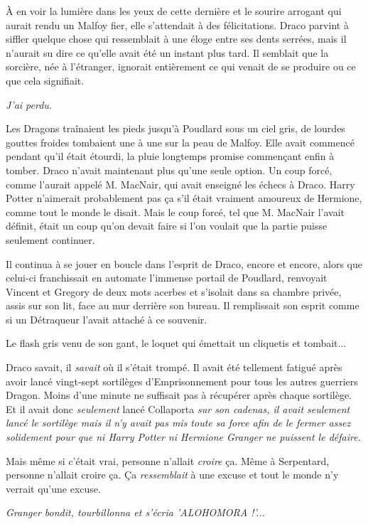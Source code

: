 À en voir la lumière dans les yeux de cette dernière et le sourire arrogant qui aurait rendu un Malfoy fier, elle s'attendait à des félicitations. Draco parvint à siffler quelque chose qui ressemblait à une éloge entre ses dents serrées, mais il n'aurait su dire ce qu'elle avait été un instant plus tard. Il semblait que la sorcière, née à l'étranger, ignorait entièrement ce qui venait de se produire ou ce que cela signifiait.

\emph{J'ai perdu.} 

Les Dragons traînaient les pieds jusqu'à Poudlard sous un ciel gris, de lourdes gouttes froides tombaient une à une sur la peau de Malfoy. Elle avait commencé pendant qu'il était étourdi, la pluie longtemps promise commençant enfin à tomber. Draco n'avait maintenant plus qu'une seule option. Un coup forcé, comme l'aurait appelé M. MacNair, qui avait enseigné les échecs à Draco. Harry Potter n'aimerait probablement pas ça s'il était vraiment amoureux de Hermione, comme tout le monde le disait. Mais le coup forcé, tel que M. MacNair l'avait définit, était un coup qu'on devait faire si l'on voulait que la partie puisse seulement continuer.

Il continua à se jouer en boucle dans l'esprit de Draco, encore et encore, alors que celui-ci franchissait en automate l'immense portail de Poudlard, renvoyait Vincent et Gregory de deux mots acerbes et s'isolait dans sa chambre privée, assis sur son lit, face au mur derrière son bureau. Il remplissait son esprit comme si un Détraqueur l'avait attaché à ce souvenir.

Le flash gris venu de son gant, le loquet qui émettait un cliquetis et tombait...

Draco savait, il \emph{savait}  où il s'était trompé. Il avait été tellement fatigué après avoir lancé vingt-sept sortilèges d'Emprisonnement pour tous les autres guerriers Dragon. Moins d'une minute ne suffisait pas à récupérer après chaque sortilège. Et il avait donc \emph{seulement}  lancé Collaporta \emph{sur son cadenas, il avait seulement lancé le sortilège mais il n'y avait pas mis toute sa force afin de le fermer assez solidement pour que ni Harry Potter ni Hermione Granger ne puissent le défaire.} 

Mais même si c'était vrai, personne n'allait \emph{croire}  ça. Même à Serpentard, personne n'allait croire ça. Ça \emph{ressemblait}  à une excuse et tout le monde n'y verrait qu'une excuse.

\emph{Granger bondit, tourbillonna et s'écria 'ALOHOMORA !'...} 

